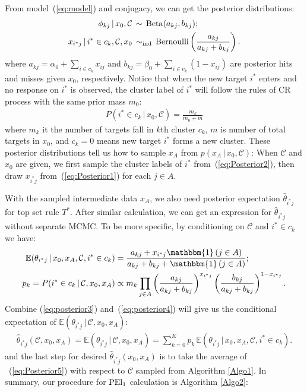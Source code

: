 \documentclass[12pt]{article}
\begin{document}
From model~(\ref{eq:model}) and conjugacy, we can get the posterior distributions:
\begin{align}
\label{eq:Posterior1}
    \begin{split}
        \phi_{kj}\,|\,x_0,\mathcal{C}\, &\sim\,{\rm Beta}(a_{kj},b_{kj});\\
        x_{i^*j}\,|\,i^*\in c_k, \mathcal{C}, x_0 \,&\sim_{\rm ind}\,{\rm Bernoulli} \left(\frac{a_{kj}}{a_{kj}+b_{kj}}\right).\\
    \end{split}
\end{align}
where $a_{kj} = \alpha_0 + \sum_{i\in c_k}x_{ij}$ and $b_{kj} = \beta_0 + \sum_{i\in c_k}(1-x_{ij})$ are posterior hits and misses given $x_0$, respectively. Notice that when the new target $i^*$ enters and no response on $i^*$ is observed, the cluster label of $i^*$ will follow the rules of CR process with the same prior mass $m_0$:
\begin{eqnarray}
\label{eq:Posterior2}
P(i^*\in c_k\,|\, x_0,\mathcal{C}) = \frac{m_k}{m_0+m}
\end{eqnarray}
where $m_k$ it the number of targets fall in $k$th cluster $c_k$, $m$ is number of total targets in $x_0$, and $c_k=0$ means new target $i^*$ forms a new cluster. These posterior distributions tell us how to sample $x_A$ from $p(x_A\,|\,x_0,\mathcal{C})$: When $\mathcal{C}$ and $x_0$ are given, we first sample the cluster labels of $i^*$ from~(\ref{eq:Posterior2}), then draw $x_{i^*j}$ from~(\ref{eq:Posterior1}) for each $j\in A$. 

With the sampled intermediate data $x_A$, we also need posterior expectation $\hat \theta_{i^*j}$ for top set rule $T^*$. After similar calculation, we can get an expression for $\hat \theta_{i^*j}$ without separate MCMC. To be more specific, by conditioning on $\mathcal{C}$ and $i^*\in c_k$ we have:
\begin{align}
    \label{eq:posterior3}
    \mathbb E(\theta_{i^*j}\,|\, x_0,x_A,\mathcal{C},i^*\in c_k) &= \frac{a_{kj}+x_{i^*j}\mathbbm{1}\left(j\in A\right)}{a_{kj}+b_{kj}+\mathbbm{1}\left(j\in A\right)};\\
    \label{eq:posterior4}
    p_k = P(i^*\in c_k\,|\,\mathcal{C},x_0,x_A)&\propto m_k\prod_{j\in A} \left(\frac{a_{kj}}{a_{kj}+b_{kj}}\right)^{x_{i^*j}}\left(\frac{b_{kj}}{a_{kj}+b_{kj}}\right)^{1-x_{i^*j}}.
\end{align}
Combine (\ref{eq:posterior3}) and~(\ref{eq:posterior4}) will give us the conditional expectation of $\mathbb E(\theta_{i^*j}\,|\, \mathcal{C},x_0,x_A)$:
\begin{eqnarray}
\label{eq:Posterior5}
\hat \theta_{i^*j}\left(\mathcal C, x_0,x_A\right) = \mathbb E(\theta_{i^*j}\,|\, \mathcal C, x_0,x_A) = \sum_{k=0}^K p_k\,\mathbb E(\theta_{i^*j}\,|\, x_0,x_A,\mathcal{C},i^*\in c_k).
\end{eqnarray}
and the last step for desired $\hat \theta_{i^*j}(x_0,x_A)$ is to take the average of ~(\ref{eq:Posterior5}) with respect to $\mathcal C$ sampled from Algorithm \ref{Algo1}. In summary, our procedure for ${\rm PEl}_1$ calculation is Algorithm \ref{Algo2}:
\end{document}
